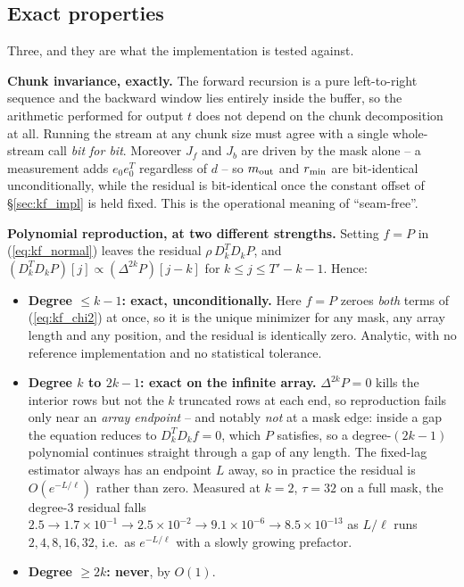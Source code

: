 \documentclass{article}
\numberwithin{equation}{section}   %
\begin{document}
\subsection{Exact properties}
\label{sec:kf_exact}

Three, and they are what the implementation is tested against.

{\bf Chunk invariance, exactly.}  The forward recursion is a pure left-to-right sequence and the backward
window lies entirely inside the buffer, so the arithmetic performed for output $t$ does not depend on the
chunk decomposition at all.  Running the stream at any chunk size must agree with a single whole-stream call
{\em bit for bit}.  Moreover $J_f$ and $J_b$ are driven by the mask alone -- a measurement adds $e_0e_0^T$
regardless of $d$ -- so $m_{\rm out}$ and $r_{\rm min}$ are bit-identical unconditionally, while
the residual is bit-identical once the constant offset of \S\ref{sec:kf_impl} is held fixed.  This is the
operational meaning of ``seam-free''.

{\bf Polynomial reproduction, at two different strengths.}  Setting $f = P$ in (\ref{eq:kf_normal}) leaves the
residual $\rho\,D_k^TD_kP$, and $(D_k^TD_kP)[j] \propto (\Delta^{2k}P)[j-k]$ for $k \le j \le T'-k-1$.  Hence:
\begin{itemize}
\item {\bf Degree $\le k-1$: exact, unconditionally.}  Here $f = P$ zeroes {\em both} terms of
(\ref{eq:kf_chi2}) at once, so it is the unique minimizer for any mask, any array length and any position, and
the residual is identically zero.  Analytic, with no reference implementation and no statistical tolerance.
\item {\bf Degree $k$ to $2k-1$: exact on the infinite array.}  $\Delta^{2k}P = 0$ kills the interior rows but
not the $k$ truncated rows at each end, so reproduction fails only near an {\em array endpoint} -- and
notably {\em not} at a mask edge: inside a gap the equation reduces to $D_k^TD_kf = 0$, which $P$ satisfies,
so a degree-$(2k{-}1)$ polynomial continues straight through a gap of any length.  The fixed-lag estimator
always has an endpoint $L$ away, so in practice the residual is $O(e^{-L/\ell})$ rather than zero.  Measured
at $k=2$, $\tau=32$ on a full mask, the degree-3 residual falls
$2.5 \rightarrow 1.7\times10^{-1} \rightarrow 2.5\times10^{-2} \rightarrow 9.1\times10^{-6} \rightarrow
8.5\times10^{-13}$ as $L/\ell$ runs $2,4,8,16,32$, i.e.~as $e^{-L/\ell}$ with a slowly growing prefactor.
\item {\bf Degree $\ge 2k$: never}, by $O(1)$.
\end{itemize}
\end{document}
